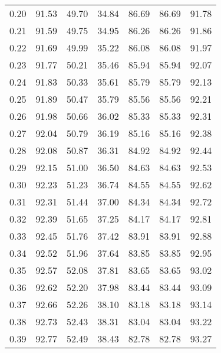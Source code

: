 \begin{tabular}{|c|c|c|c|c|c|c|}
      0.20 &     91.53 &     49.70 &      34.84 &   86.69 &      86.69 &         91.78 \\
      0.21 &     91.59 &     49.75 &      34.95 &   86.26 &      86.26 &         91.86 \\
      0.22 &     91.69 &     49.99 &      35.22 &   86.08 &      86.08 &         91.97 \\
      0.23 &     91.77 &     50.21 &      35.46 &   85.94 &      85.94 &         92.07 \\
      0.24 &     91.83 &     50.33 &      35.61 &   85.79 &      85.79 &         92.13 \\
      0.25 &     91.89 &     50.47 &      35.79 &   85.56 &      85.56 &         92.21 \\
      0.26 &     91.98 &     50.66 &      36.02 &   85.33 &      85.33 &         92.31 \\
      0.27 &     92.04 &     50.79 &      36.19 &   85.16 &      85.16 &         92.38 \\
      0.28 &     92.08 &     50.87 &      36.31 &   84.92 &      84.92 &         92.44 \\
      0.29 &     92.15 &     51.00 &      36.50 &   84.63 &      84.63 &         92.53 \\
      0.30 &     92.23 &     51.23 &      36.74 &   84.55 &      84.55 &         92.62 \\
      0.31 &     92.31 &     51.44 &      37.00 &   84.34 &      84.34 &         92.72 \\
      0.32 &     92.39 &     51.65 &      37.25 &   84.17 &      84.17 &         92.81 \\
      0.33 &     92.45 &     51.76 &      37.42 &   83.91 &      83.91 &         92.88 \\
      0.34 &     92.52 &     51.96 &      37.64 &   83.85 &      83.85 &         92.95 \\
      0.35 &     92.57 &     52.08 &      37.81 &   83.65 &      83.65 &         93.02 \\
      0.36 &     92.62 &     52.20 &      37.98 &   83.44 &      83.44 &         93.09 \\
      0.37 &     92.66 &     52.26 &      38.10 &   83.18 &      83.18 &         93.14 \\
      0.38 &     92.73 &     52.43 &      38.31 &   83.04 &      83.04 &         93.22 \\
      0.39 &     92.77 &     52.49 &      38.43 &   82.78 &      82.78 &         93.27 \\

\end{tabular}
